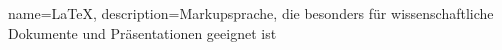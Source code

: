 {
    name=\LaTeX,
    description={Markupsprache, die besonders für
      wissenschaftliche Dokumente und
      Präsentationen geeignet ist}
}

